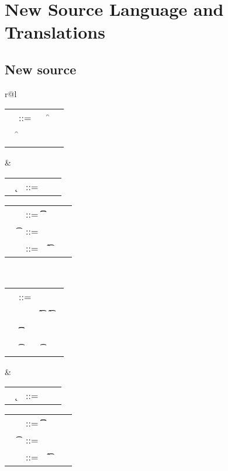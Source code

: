\documentclass[acmlarge, anonymous, authordraft]{acmart}
\begin{document}
\section{New Source Language and Translations}

\subsection{New source}
\begin{tabular}{r@{}l}
\begin{minipage}{6cm}\begin{tabular}{@{}l@{~}l@{}l@{}l@{}l}
\e &::=  \x         &\B \this    &\B \FRead\f      \\
   &\B \FWrite\f\e &\B \Call\e\m\e &\B \DynCall\e\m\e  \\
   &\B \New\C{\b\e}  \\ 
   
\end{tabular}\end{minipage} &
\begin{minipage}{5.9cm}\begin{tabular}{l@{~}l@{}l@{}l}
   ~ \k &::= \Class \C {\b\fd}{\b\md}
\end{tabular}
\begin{tabular}{l@{~}l@{}l@{}l}
\md &::= \Mdef\m\x\t\t\e   \\
~ \t&::= ~ \any  \B   \C  \\ 
~\fd&::= ~ \Fdef\f\t \\ 
\end{tabular}\end{minipage} \\
\begin{minipage}{6cm}\begin{tabular}{@{}l@{~}l@{}l@{}l@{}l}
\e &::=  \x         &\B \this         &\B \that      \\
   &\B \New\C{\b\e}  &\B \FRead\f\t   &\B \FWrite\f\t\e   \\
   &\B \KCall\e\m\e\t\t &\B \DynCall\e\m\e &\B \a \\ 
   &\B \SubCast\t\e &\B \BehCast\t\e 
\end{tabular}\end{minipage} &
\begin{minipage}{5.9cm}\begin{tabular}{l@{~}l@{}l@{}l}
   ~ \k &::= \Class \C {\b\fd}{\b\md}
\end{tabular}
\begin{tabular}{l@{~}l@{}l@{}l}
\md &::= \Mdef\m\x\t\t\e   \\
~ \t&::= ~ \any  \B   \C  \\ 
~\fd&::= ~ \Fdef\f\t \\ 
\end{tabular}\end{minipage}
\end{tabular}
\end{document}
